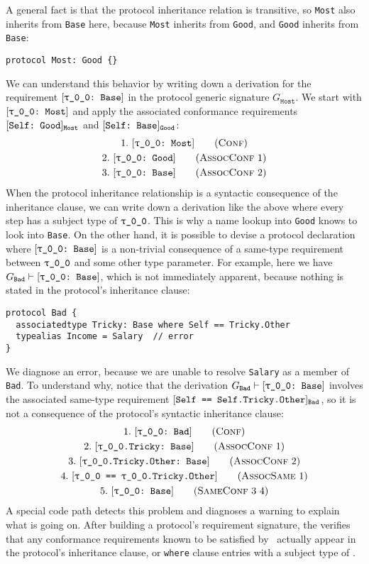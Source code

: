 \documentclass[../generics]{subfiles}
\begin{document}
A general fact is that the protocol inheritance relation is transitive, so \texttt{Most} also inherits from \texttt{Base} here, because \texttt{Most} inherits from \texttt{Good}, and \texttt{Good} inherits from \texttt{Base}:
\begin{Verbatim}
protocol Most: Good {}
\end{Verbatim}
We can understand this behavior by writing down a derivation for the requirement $\ConfReq{\rT}{Base}$ in the protocol generic signature $G_\texttt{Most}$. We start with $\ConfReq{\rT}{Most}$ and apply the associated conformance requirements $[\texttt{Self:~Good}]_{\texttt{Most}}$ and $[\texttt{Self:~Base}]_{\texttt{Good}}$:
\begin{gather*}
\ConfStep{\rT}{Most}{1}\\
\AssocConfStep{1}{\rT}{Good}{2}\\
\AssocConfStep{2}{\rT}{Base}{3}
\end{gather*}
When the protocol inheritance relationship is a syntactic consequence of the inheritance clause, we can write down a derivation like the above where every step has a subject type of $\rT$. This is why a name lookup into \texttt{Good} knows to look into \texttt{Base}. On the other hand, it is possible to devise a protocol declaration where $\ConfReq{\rT}{Base}$ is a non-trivial consequence of a same-type requirement between $\rT$ and some other type parameter. For example, here we have $G_\texttt{Bad}\vdash\ConfReq{\rT}{Base}$, which is not immediately apparent, because nothing is stated in the protocol's inheritance clause:
\begin{Verbatim}
protocol Bad {
  associatedtype Tricky: Base where Self == Tricky.Other
  typealias Income = Salary  // error
}
\end{Verbatim}
We diagnose an error, because we are unable to resolve \texttt{Salary} as a member of \texttt{Bad}. To understand why, notice that the derivation $G_\texttt{Bad} \vdash \ConfReq{\rT}{Base}$ involves the associated same-type requirement $[\texttt{Self == Self.Tricky.Other}]_{\texttt{Bad}}$, so it is not a consequence of the protocol's syntactic inheritance clause:
\begin{gather*}
\ConfStep{\rT}{Bad}{1}\\
\AssocConfStep{1}{\rT.Tricky}{Base}{2}\\
\AssocConfStep{2}{\rT.Tricky.Other}{Base}{3}\\
\AssocSameStep{1}{\rT}{\rT.Tricky.Other}{4}\\
\SameConfStep{3}{4}{\rT}{Base}{5}
\end{gather*}
A special code path detects this problem and diagnoses a warning to explain what is going on. After building a protocol's requirement signature, the  verifies that any conformance requirements known to be satisfied by \tSelf\ actually appear in the protocol's inheritance clause, or \texttt{where} clause entries with a subject type of \tSelf.
\end{document}
